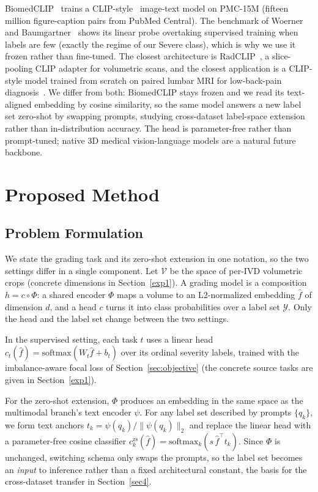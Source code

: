\documentclass[runningheads]{llncs}
\begin{document}
BiomedCLIP~\cite{zhang2023biomedclip} trains a CLIP-style~\cite{radford2021clip} image-text model on PMC-15M (fifteen million figure-caption pairs from PubMed Central). The benchmark of Woerner and Baumgartner~\cite{datascarcity2024} shows its linear probe overtaking supervised training when labels are few (exactly the regime of our Severe class), which is why we use it frozen rather than fine-tuned. The closest architecture is RadCLIP~\cite{lu2024radclip}, a slice-pooling CLIP adapter for volumetric scans, and the closest application is a CLIP-style model trained from scratch on paired lumbar MRI for low-back-pain diagnosis~\cite{le2025lumbarclip}. We differ from both: BiomedCLIP stays frozen and we read its text-aligned embedding by cosine similarity, so the same model answers a new label set zero-shot by swapping prompts, studying cross-dataset label-space extension rather than in-distribution accuracy. The head is parameter-free rather than prompt-tuned; native 3D medical vision-language models are a natural future backbone.

\section{Proposed Method}\label{sec3}

\subsection{Problem Formulation}\label{sec:formulation}

We state the grading task and its zero-shot extension in one notation, so the two settings differ in a single component. Let $\mathcal{V}$ be the space of per-IVD volumetric crops (concrete dimensions in Section~\ref{exp1}). A grading model is a composition $h = c \circ \Phi$: a shared encoder $\Phi$ maps a volume to an L2-normalized embedding $\hat{f}$ of dimension $d$, and a head $c$ turns it into class probabilities over a label set $\mathcal{Y}$. Only the head and the label set change between the two settings.

In the supervised setting, each task $t$ uses a linear head $c_t(\hat f) = \mathrm{softmax}(W_t \hat f + b_t)$ over its ordinal severity labels, trained with the imbalance-aware focal loss of Section~\ref{sec:objective} (the concrete source tasks are given in Section~\ref{exp1}).

For the zero-shot extension, $\Phi$ produces an embedding in the same space as the multimodal branch's text encoder $\psi$. For any label set described by prompts $\{q_k\}$, we form text anchors $t_k = \psi(q_k)/\|\psi(q_k)\|_2$ and replace the linear head with a parameter-free cosine classifier $c^{\text{zs}}_k(\hat f) = \mathrm{softmax}_k(s\,\hat f^{\top} t_k)$. Since $\Phi$ is unchanged, switching schema only swaps the prompts, so the label set becomes an \emph{input} to inference rather than a fixed architectural constant, the basis for the cross-dataset transfer in Section~\ref{sec4}.
\end{document}
